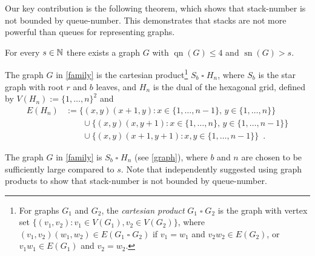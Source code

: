 \documentclass[kpfonts]{patmorin}
\DeclareMathOperator{\sn}{sn}
\DeclareMathOperator{\qn}{qn}
\renewcommand{\le}{\leqslant}
\newcommand{\CartProd}{\mathbin{\square}}
\begin{document}

Our key contribution is the following theorem, which shows that stack-number is not bounded by queue-number. This demonstrates that stacks are not more powerful than queues for representing graphs. 

\begin{thm}\label{family}
	For every $s\in \mathbb{N}$ there exists a graph $G$ with $\qn(G)\le 4$ and $\sn(G)>s$.
\end{thm}

The graph $G$ in \cref{family} is the cartesian product\footnote{For graphs $G_1$ and $G_2$, the \emph{cartesian product} $G_1\CartProd G_2$ is the graph with vertex set $\{(v_1,v_2): v_1 \in V(G_1), v_2 \in V(G_2)\}$, where $(v_1,v_2)(w_1,w_2)\in E(G_1\CartProd G_2)$ if $v_1=w_1$ and $v_2w_2\in E(G_2)$, or $v_1w_1\in E(G_1)$ and $v_2=w_2$.} $S_b\CartProd H_n$, where $S_b$ is the star graph with root $r$ and $b$ leaves, and $H_n$ is the dual of the hexagonal grid, defined by $V(H_n):=\{1,\ldots,n\}^2$ and
\begin{align*}
E(H_n) & :=  \{(x,y)(x+1,y):x\in\{1,\ldots,n-1\},\,y\in\{1,\ldots,n\}\} \\
& \qquad \cup \{(x,y)(x,y+1):x\in\{1,\ldots,n\},\,y\in\{1,\ldots,n-1\}\} \\
& \qquad \cup \{(x,y)(x+1,y+1):x,y\in\{1,\ldots,n-1\}\} \enspace .
\end{align*}

The graph $G$ in \cref{family} is $S_b \CartProd H_n$ (see \cref{graph}), where $b$ and $n$ are chosen to be sufficiently large compared to $s$.
Note that \citet{Pupyrev20} independently suggested using graph products to show that stack-number is not bounded by queue-number.
\end{document}

